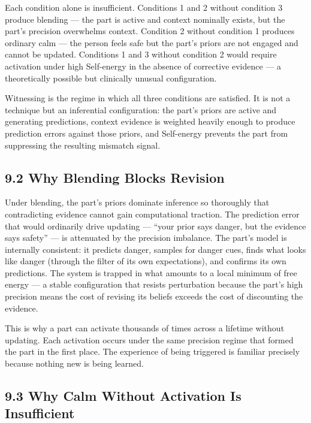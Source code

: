 \documentclass[11pt]{article}
\begin{document}
Each condition alone is insufficient. Conditions 1 and 2 without
condition 3 produce blending --- the part is active and context
nominally exists, but the part's precision overwhelms context. Condition
2 without condition 1 produces ordinary calm --- the person feels safe
but the part's priors are not engaged and cannot be updated. Conditions
1 and 3 without condition 2 would require activation under high
Self-energy in the absence of corrective evidence --- a theoretically
possible but clinically unusual configuration.

Witnessing is the regime in which all three conditions are satisfied. It
is not a technique but an inferential configuration: the part's priors
are active and generating predictions, context evidence is weighted
heavily enough to produce prediction errors against those priors, and
Self-energy prevents the part from suppressing the resulting mismatch
signal.

\subsection{9.2 Why Blending Blocks
Revision}\label{why-blending-blocks-revision}

Under blending, the part's priors dominate inference so thoroughly that
contradicting evidence cannot gain computational traction. The
prediction error that would ordinarily drive updating --- ``your prior
says danger, but the evidence says safety'' --- is attenuated by the
precision imbalance. The part's model is internally consistent: it
predicts danger, samples for danger cues, finds what looks like danger
(through the filter of its own expectations), and confirms its own
predictions. The system is trapped in what amounts to a local minimum of
free energy --- a stable configuration that resists perturbation because
the part's high precision means the cost of revising its beliefs exceeds
the cost of discounting the evidence.

This is why a part can activate thousands of times across a lifetime
without updating. Each activation occurs under the same precision regime
that formed the part in the first place. The experience of being
triggered is familiar precisely because nothing new is being learned.

\subsection{9.3 Why Calm Without Activation Is
Insufficient}\label{why-calm-without-activation-is-insufficient}
\end{document}
